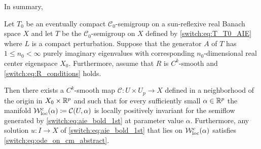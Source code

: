 In summary,

\begin{theorem}
  \label{switch:thm:cmabstract}
  Let $T_0$ be an eventually compact $\mathcal{C}_0$-semigroup on a sun-reflexive real Banach space $X$ and let $T$ be the $\mathcal{C}_0$-semigroup on $X$ defined by \cref{switch:eq:T_T0_AIE} where $L$ is a compact perturbation. Suppose that the generator $A$ of $T$ has $1 \le n_0 < \infty$ purely imaginary eigenvalues with corresponding $n_0$-dimensional real center eigenspace $X_0$. Furthermore, assume that $R$ is $C^k$-smooth and \cref{switch:eq:R_conditions} holds.

  Then there exists a $C^k$-smooth map $\mathcal{C} : U \times U_p \to X$ defined in a neighborhood of the origin in $X_0 \times \mathbb{R}^p$ and such that for every sufficiently small $\alpha \in \mathbb{R}^p$ the manifold $\mathcal{W}^c_{\text{loc}}(\alpha) \coloneqq \mathcal{C}(U,\alpha)$ is locally positively invariant for the semiflow generated by \cref{switch:eq:aie_bold_1st} at parameter value $\alpha$. Furthermore, any solution $u : I \to X$ of \cref{switch:eq:aie_bold_1st} that lies on $\mathcal{W}^c_{\text{loc}}(\alpha)$ satisfies \cref{switch:eq:ode_on_cm_abstract}.  
\end{theorem}

